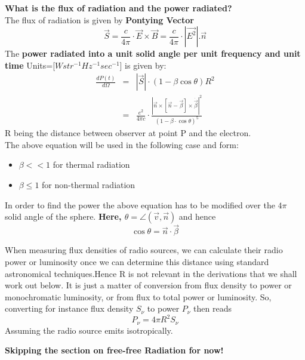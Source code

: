 \documentclass[12pt]{report}
\newcommand{\cbox}{tcolorbox}
\newcommand{\rr}[1]{\left[{#1}\right]}
\newcommand{\vd}[1]{\dot{\vec{#1}}}
\begin{document}
\textbf{What is the flux of radiation and the power radiated?}\\
The flux of radiation is given by \textbf{Pontying Vector}
\begin{equation}
\vec{S}=\frac{c}{4\pi}\cdot \vec{E}\times\vec{B}=\frac{c}{4\pi}\cdot |\vec{E^2}|.\vec{n}
\end{equation}
The \textbf{power radiated into a unit solid angle per unit frequency and unit time} Units=[$Wstr^{-1}Hz^{-1}sec^{-1}$] is given by:
\begin{align}
\frac{dP(t)}{d\Omega}&=&|\vec{S}|\cdot(1-\beta \cos \theta)R^2\\
&=&\frac{e^2}{4 \pi c}\cdot \frac{|\vec{n}\times\rr{\vec{n}-\vec{\beta}}\times\vd{\beta}|^2}{(1-\beta \cdot \cos \theta)^5}
\end{align}
R being the distance between observer at point P and the electron.\\
The above equation will be used in the following case and form:
\begin{itemize}
\item $\beta<<1$ for  thermal radiation
\item $\beta\leq 1$ for non-thermal radiation
\end{itemize}
In order to find the power the above equation has to be modified over the $4\pi$ solid angle of the sphere. \textbf{Here, $\theta=\angle (\vec{v},\vec{n})$} and hence
\begin{equation*}
\cos \theta = \vec{n} \cdot \vec{\beta}
\end{equation*}
\begin{\cbox}
When measuring flux densities of radio sources, we can calculate their radio power or luminosity once we can determine this distance using standard astronomical techniques.Hence R is not relevant in the derivations that we shall work out below. It is just a matter of conversion from flux density to power or monochromatic luminosity, or from flux to total power or luminosity. So, converting for instance flux density $S_\nu$ to power $P_\nu$ then reads
\begin{equation*}
P_\nu=4 \pi R^2 S_\nu
\end{equation*}
Assuming the radio source emits isotropically.
\end{\cbox}
\textbf{Skipping the section on free-free Radiation for now!}
\end{document}

